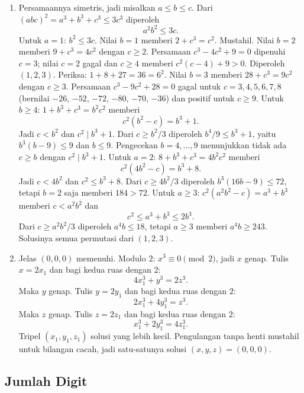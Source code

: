\documentclass[12pt]{scrartcl}
\begin{document}
\begin{enumerate}[resume]
	\item Persamaannya simetris, jadi misalkan $a \le b \le c$.
	Dari $(abc)^2 = a^3 + b^3 + c^3 \le 3c^3$ diperoleh
	\[ a^2b^2 \le 3c. \]
	Untuk $a = 1$: $b^2 \le 3c$.
	Nilai $b = 1$ memberi $2 + c^3 = c^2$. Mustahil.
	Nilai $b = 2$ memberi $9 + c^3 = 4c^2$ dengan $c \ge 2$.
	Persamaan $c^3 - 4c^2 + 9 = 0$ dipenuhi $c = 3$;
	nilai $c = 2$ gagal dan $c \ge 4$ memberi $c^2(c - 4) + 9 > 0$.
	Diperoleh $(1, 2, 3)$. Periksa: $1 + 8 + 27 = 36 = 6^2$.
	Nilai $b = 3$ memberi $28 + c^3 = 9c^2$ dengan $c \ge 3$.
	Persamaan $c^3 - 9c^2 + 28 = 0$ gagal untuk $c = 3, 4, 5, 6, 7, 8$
	(bernilai $-26$, $-52$, $-72$, $-80$, $-70$, $-36$)
	dan positif untuk $c \ge 9$.
	Untuk $b \ge 4$: $1 + b^3 + c^3 = b^2c^2$ memberi
	\[ c^2(b^2 - c) = b^3 + 1. \]
	Jadi $c < b^2$ dan $c^2 \mid b^3 + 1$.
	Dari $c \ge b^2/3$ diperoleh $b^4/9 \le b^3 + 1$,
	yaitu $b^3(b - 9) \le 9$ dan $b \le 9$.
	Pengecekan $b = 4, \dots, 9$ menunjukkan tidak ada $c \ge b$
	dengan $c^2 \mid b^3 + 1$.
	Untuk $a = 2$: $8 + b^3 + c^3 = 4b^2c^2$ memberi
	\[ c^2(4b^2 - c) = b^3 + 8. \]
	Jadi $c < 4b^2$ dan $c^2 \le b^3 + 8$.
	Dari $c \ge 4b^2/3$ diperoleh $b^3(16b - 9) \le 72$,
	tetapi $b = 2$ saja memberi $184 > 72$.
	Untuk $a \ge 3$: $c^2(a^2b^2 - c) = a^3 + b^3$ memberi $c < a^2b^2$ dan
	\[ c^2 \le a^3 + b^3 \le 2b^3. \]
	Dari $c \ge a^2b^2/3$ diperoleh $a^4b \le 18$,
	tetapi $a \ge 3$ memberi $a^4b \ge 243$.
	Solusinya semua permutasi dari $(1, 2, 3)$.

	\item Jelas $(0, 0, 0)$ memenuhi.
	Modulo $2$: $x^3 \equiv 0 \pmod{2}$, jadi $x$ genap.
	Tulis $x = 2x_1$ dan bagi kedua ruas dengan $2$:
	\[ 4x_1^3 + y^3 = 2z^3. \]
	Maka $y$ genap. Tulis $y = 2y_1$ dan bagi kedua ruas dengan $2$:
	\[ 2x_1^3 + 4y_1^3 = z^3. \]
	Maka $z$ genap. Tulis $z = 2z_1$ dan bagi kedua ruas dengan $2$:
	\[ x_1^3 + 2y_1^3 = 4z_1^3. \]
	Tripel $(x_1, y_1, z_1)$ solusi yang lebih kecil.
	Pengulangan tanpa henti mustahil untuk bilangan cacah,
	jadi satu-satunya solusi $(x, y, z) = (0, 0, 0)$.
\end{enumerate}

\subsection{Jumlah Digit}
\end{document}
